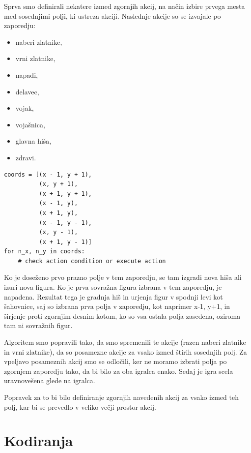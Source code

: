 \documentclass[a4paper, 12pt]{book}
\begin{document}
Sprva smo definirali nekatere izmed zgornjih akcij, na način izbire prvega mesta med sosednjimi polji, ki ustreza akciji. 
Naslednje akcije so se izvajale po zaporedju:
\begin{itemize}
	\item naberi zlatnike,
	\item vrni zlatnike,
	\item napadi,
	\item delavec,
	\item vojak, 
	\item vojašnica,
	\item glavna hiša,
	\item zdravi.
\end{itemize}
\begin{verbatim}
coords = [(x - 1, y + 1),
          (x, y + 1),
          (x + 1, y + 1),
          (x - 1, y),
          (x + 1, y),
          (x - 1, y - 1),
          (x, y - 1),
          (x + 1, y - 1)]
for n_x, n_y in coords:
    # check action condition or execute action
\end{verbatim}
Ko je doseženo prvo prazno polje v tem zaporedju, se tam izgradi nova hiša ali izuri nova figura.
Ko je prva sovražna figura izbrana v tem zaporedju, je napadena.
Rezultat tega je gradnja hiš in urjenja figur v spodnji levi kot šahovnice, saj so izbrana prva polja v zaporedju, kot naprimer x-1, y+1, in širjenje proti zgornjim desnim kotom, ko so vsa ostala polja zasedena, oziroma tam ni sovražnih figur.

Algoritem smo popravili tako, da smo spremenili te akcije (razen naberi zlatnike in vrni zlatnike), da so posamezne akcije za vsako izmed štirih sosednjih polj.
Za vpeljavo posameznih akcij smo se odločili, ker ne moramo izbrati polja po zgornjem zaporedju tako, da bi bilo za oba igralca enako.
Sedaj je igra scela uravnovešena glede na igralca.

Popravek za to bi bilo definiranje zgornjih navedenih akcij za vsako izmed teh polj, kar bi se prevedlo v veliko večji prostor akcij.

\section{Kodiranja}
\end{document}
